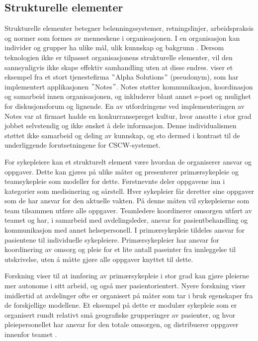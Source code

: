 \subsection{Strukturelle elementer}
\label{sec:strukturelle_elementer}
Strukturelle elementer betegner belønningssystemer, retningslinjer, arbeidspraksis og normer som formes av menneskene i organisasjonen. I en organisasjon kan individer og grupper ha ulike mål, ulik kunnskap og bakgrunn \citep{Ackermann00}. Dersom teknologien ikke er tilpasset organisasjonens strukturelle elementer, vil den sannsynligvis ikke skape effektiv samhandling uten at disse endres. \citet{Orlikowski92} viser et eksempel fra et stort tjenestefirma $"$Alpha Solutions$"$ (pseudonym), som har implementert applikasjonen $"$Notes$"$. Notes støtter kommunikasjon, koordinasjon og samarbeid innen organisasjonen, og inkluderer blant annet e-post og mulighet for diskusjonsforum og lignende. En av utfordringene ved implementeringen av Notes var at firmaet hadde en konkurransepreget kultur, hvor ansatte i stor grad jobbet selvstendig og ikke ønsket å dele informasjon. Denne individualismen støttet ikke samarbeid og deling av kunnskap, og sto dermed i kontrast til de underliggende forutsetningene for CSCW-systemet. 


\noindent
For sykepleiere kan et strukturelt element være hvordan de organiserer ansvar og oppgaver. Dette kan gjøres på ulike måter og \citet{Rygh13} presenterer primærsykepleie og teamsykepleie som modeller for dette. Førstnevnte deler oppgavene inn i kategorier som medisinering og sårstell. Hver sykepleier får deretter sine oppgaver som de har ansvar for den aktuelle vakten. På denne måten vil sykepleierne som team tilsammen utføre alle oppgaver. Teamledere koordinerer omsorgen utført av teamet og har, i samarbeid med avdelingsleder, ansvar for pasientbehandling og kommunikasjon med annet helsepersonell. I primærsykepleie tildeles ansvar for pasientene til individuelle sykepleiere. Primærsykepleier har ansvar for koordinering av omsorg og pleie for et lite antall paseinter fra innleggelse til utskrivelse, uten å måtte gjøre alle oppgaver knyttet til dette. 

\noindent
Forskning viser til at innføring av primærsykepleie i stor grad kan gjøre pleierne mer autonome i sitt arbeid, og også mer pasientorientert. Nyere forskning viser imidlertid at avdelinger ofte er organisert på måter som tar i bruk egenskaper fra de forskjellige modellene. Et eksempel på dette er modulær sykepleie som er organisert rundt relativt små geografiske grupperinger av pasienter, og hvor pleiepersonellet har ansvar for den totale omsorgen, og distribuerer oppgaver innenfor teamet \citep{Rygh13}.


